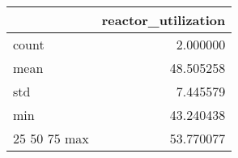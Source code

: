 \begin{tabular}{lr}
\toprule
 & reactor\_utilization \\
\midrule
count & 2.000000 \\
mean & 48.505258 \\
std & 7.445579 \\
min & 43.240438 \\
25%
50%
75%
max & 53.770077 \\
\bottomrule
\end{tabular}

